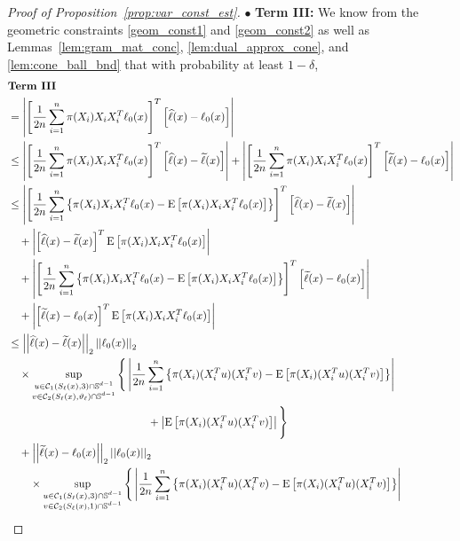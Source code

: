 \documentclass[ejsv2,noshowframe]{imsart}
\theoremstyle{plain}
\theoremstyle{definition}
\theoremstyle{remark}
\newcommand{\norm}[1]{\left|\left| #1 \right|\right|}
\renewcommand{\hat}{\widehat}
\renewcommand{\tilde}{\widetilde}
\begin{document}
\begin{proof}[Proof of Proposition~\ref{prop:var_const_est}]
	\noindent$\bullet$ \textbf{Term III:} We know from the geometric constraints \eqref{geom_const1} and \eqref{geom_const2} as well as Lemmas~\ref{lem:gram_mat_conc}, \ref{lem:dual_approx_cone}, and \ref{lem:cone_ball_bnd} that with probability at least $1-\delta$,
	\begin{align*}
		&\textbf{Term III} \\
		&= \left|\left[\frac{1}{2n}\sum_{i=1}^n \pi(X_i) X_iX_i^T \ell_0(x)\right]^T \left[\hat{\ell}(x)-\ell_0(x) \right] \right|\\
		&\leq \left|\left[\frac{1}{2n}\sum_{i=1}^n \pi(X_i) X_iX_i^T \ell_0(x)\right]^T \left[\hat{\ell}(x)-\tilde{\ell}(x) \right] \right| + \left|\left[\frac{1}{2n}\sum_{i=1}^n \pi(X_i) X_iX_i^T \ell_0(x)\right]^T \left[\tilde{\ell}(x)-\ell_0(x) \right] \right|\\
		&\leq \left|\left[\frac{1}{2n}\sum_{i=1}^n \left\{\pi(X_i) X_iX_i^T \ell_0(x) -\mathrm{E}\left[\pi(X_i)X_iX_i^T \ell_0(x)\right] \right\}\right]^T \left[\hat{\ell}(x)-\tilde{\ell}(x) \right] \right| \\
		&\quad + \left|\left[\hat{\ell}(x) -\tilde{\ell}(x)\right]^T \mathrm{E}\left[\pi(X_i)X_iX_i^T\ell_0(x)\right] \right|\\
		&\quad + \left|\left[\frac{1}{2n}\sum_{i=1}^n \left\{\pi(X_i) X_iX_i^T \ell_0(x) -\mathrm{E}\left[\pi(X_i)X_iX_i^T \ell_0(x)\right] \right\}\right]^T \left[\tilde{\ell}(x) -\ell_0(x)\right] \right| \\
		&\quad + \left|\left[\tilde{\ell}(x) -\ell_0(x)\right]^T \mathrm{E}\left[\pi(X_i)X_iX_i^T\ell_0(x)\right] \right|\\
		&\leq \norm{\hat{\ell}(x)-\tilde{\ell}(x)}_2 \norm{\ell_0(x)}_2\\
		&\quad \times  \sup_{\substack{u\in \mathcal{C}_1(S_{\ell}(x),3) \cap \mathbb{S}^{d-1}\\ v\in \mathcal{C}_2(S_{\ell}(x),\vartheta_{\ell}) \cap \mathbb{S}^{d-1}}} \Bigg\{\left|\frac{1}{2n}\sum_{i=1}^n \left\{\pi(X_i) (X_i^Tu)(X_i^Tv) -\mathrm{E}\left[\pi(X_i) (X_i^Tu) (X_i^Tv)\right] \right\} \right| \\
		&\hspace{45mm} + \left|\mathrm{E}\left[\pi(X_i) (X_i^Tu) (X_i^Tv)\right]\right| \Bigg\}\\
		&\quad + \norm{\tilde{\ell}(x) - \ell_0(x)}_2 \norm{\ell_0(x)}_2\\
		&\quad\quad \times \sup_{\substack{u\in \mathcal{C}_1(S_{\ell}(x),3) \cap \mathbb{S}^{d-1}\\ v\in \mathcal{C}_2(S_{\ell}(x),1) \cap \mathbb{S}^{d-1}}} \Bigg\{\left|\frac{1}{2n}\sum_{i=1}^n \left\{\pi(X_i) (X_i^Tu)(X_i^Tv) -\mathrm{E}\left[\pi(X_i) (X_i^Tu) (X_i^Tv)\right] \right\} \right| \\

\end{align*}
\end{proof}
\end{document}
